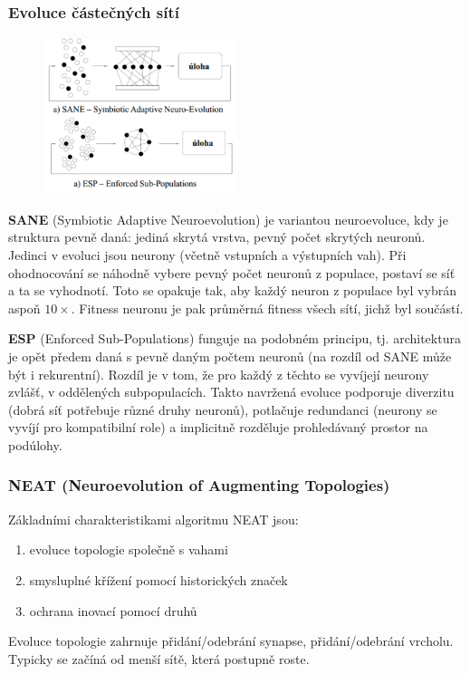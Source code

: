 \subsubsection{Evoluce částečných sítí}
\setlength\intextsep{0pt}
\begin{figure}
	\includegraphics[width=0.5\textwidth]{img/sane_esp.png}
\end{figure}
\textbf{SANE} (Symbiotic Adaptive Neuroevolution) je variantou neuroevoluce, kdy je struktura pevně daná: jediná skrytá vrstva, pevný počet skrytých neuronů. Jedinci v evoluci jsou neurony (včetně vstupních a výstupních vah). Při ohodnocování se náhodně vybere pevný počet neuronů z populace, postaví se síť a ta se vyhodnotí. Toto se opakuje tak, aby každý neuron z populace byl vybrán aspoň $10\times$. Fitness neuronu je pak průměrná fitness všech sítí, jichž byl součástí.

\textbf{ESP} (Enforced Sub-Populations) funguje na podobném principu, tj. architektura je opět předem daná s pevně daným počtem neuronů (na rozdíl od SANE může být i rekurentní). Rozdíl je v tom, že pro každý z těchto  se vyvíjejí neurony zvlášť, v oddělených subpopulacích. Takto navržená evoluce podporuje diverzitu (dobrá síť potřebuje různé druhy neuronů), potlačuje redundanci (neurony se vyvíjí pro kompatibilní role) a implicitně rozděluje prohledávaný prostor na podúlohy.


\subsubsection{NEAT (Neuroevolution of Augmenting Topologies)}
Základními charakteristikami algoritmu NEAT jsou: 
\begin{enumerate}
	\leftskip 20pt
	\setlength{\itemsep}{0pt}
	\item evoluce topologie společně s vahami
	\item smysluplné křížení pomocí historických značek
	\item ochrana inovací pomocí druhů
\end{enumerate}
Evoluce topologie zahrnuje přidání/odebrání synapse, přidání/odebrání vrcholu. Typicky se začíná od menší sítě, která postupně roste.

